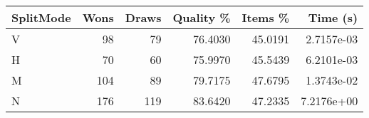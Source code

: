 \begin{tabular}{lrrrrr}
    \hline
    SplitMode & Wons & Draws & Quality \% & Items \% & Time (s)   \\
    \hline
    V         & 98   & 79    & 76.4030    & 45.0191  & 2.7157e-03 \\
    H         & 70   & 60    & 75.9970    & 45.5439  & 6.2101e-03 \\
    M         & 104  & 89    & 79.7175    & 47.6795  & 1.3743e-02 \\
    N         & 176  & 119   & 83.6420    & 47.2335  & 7.2176e+00 \\
    \hline
\end{tabular}